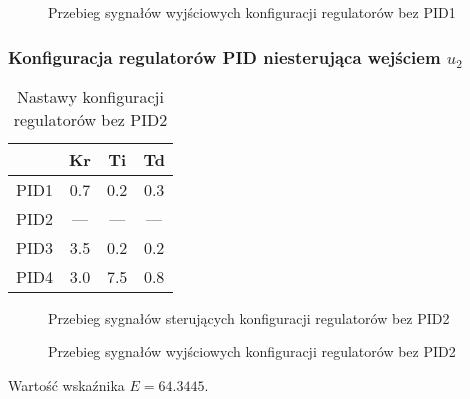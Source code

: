 \ifdefined\CompileFigures
    \begin{figure}[H] 
        \centering
        
        \caption{Przebieg sygnałów wyjściowych konfiguracji regulatorów bez PID1}
        \label{projekt:zad4:figure:yprojzadanie4PIDbezu1u}
    \end{figure}
\fi

\newpage
\subsubsection{Konfiguracja regulatorów PID niesterująca wejściem $u_{2}$}

\begin{table}[H]
    \centering
    \begin{tabular}{|l|c|c|c|}
    \hline
         & Kr  & Ti  & Td  \\ \hline
    PID1 & 0.7 & 0.2 & 0.3 \\ \hline
    PID2 & --- & --- & ---  \\ \hline
    PID3 & 3.5 & 0.2 & 0.2 \\ \hline
    PID4 & 3.0 & 7.5 & 0.8 \\ \hline
    \end{tabular}
    \caption[H]{Nastawy konfiguracji regulatorów bez PID2}
\end{table}

\ifdefined\CompileFigures
    \begin{figure}[H] 
        \centering
        
        \caption{Przebieg sygnałów sterujących konfiguracji regulatorów bez PID2}
        \label{projekt:zad4:figure:projzadanie4PIDbezu2u}
    \end{figure}
\fi

\ifdefined\CompileFigures
    \begin{figure}[H] 
        \centering
        
        \caption{Przebieg sygnałów wyjściowych konfiguracji regulatorów bez PID2}
        \label{projekt:zad4:figure:projzadanie4PIDbezu2y}
    \end{figure}
\fi

Wartość wskaźnika $E=\num{64.3445}$.

\newpage
